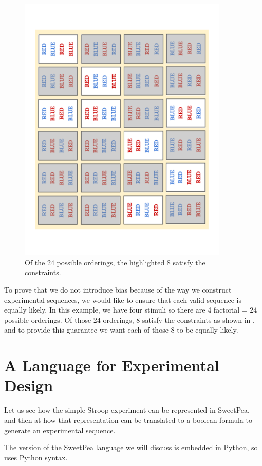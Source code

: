 \begin{figure}[t]
    \centerline{\includegraphics[angle=270,origin=c,width=10cm]{fig_valid_seqs}}
    \caption{Of the 24 possible orderings, the highlighted 8 satisfy the constraints.}%
    \label{fig:valid_seqs}%
\end{figure}

To prove that we do not introduce bias because of the way we construct experimental sequences, we would like to ensure that each valid sequence is equally likely. In this example, we have four stimuli so there are 4 factorial = 24 possible orderings. Of those 24 orderings, 8 satisfy the constraints as shown in , and to provide this guarantee we want each of those 8 to be equally likely.






\section{A Language for Experimental Design}

Let us see how the simple Stroop experiment can be represented in SweetPea, and then at how that representation can be translated to a boolean formula to generate an experimental sequence.

The version of the SweetPea language we will discuss is embedded in Python, so uses Python syntax.

